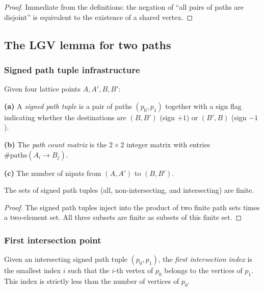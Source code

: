 \begin{proof}
\leanok
Immediate from the definitions: the negation of ``all pairs of paths are
disjoint'' is equivalent to the existence of a shared vertex.
\end{proof}

\subsection{The LGV lemma for two paths}

\subsubsection{Signed path tuple infrastructure}

\begin{definition}
\label{def.lgv.signed-pathtup2}
\leanhelper
\leanok
Given four lattice points $A, A', B, B'$:

\textbf{(a)} A \emph{signed path tuple} is a pair of paths $(p_0, p_1)$ together
with a sign flag indicating whether the destinations
are $(B, B')$ (sign $+1$) or $(B', B)$ (sign $-1$).

\textbf{(b)} The \emph{path count matrix} is
the $2 \times 2$ integer matrix with entries $\#\mathrm{paths}(A_i \to B_j)$.

\textbf{(c)} The number of nipats from
$(A, A')$ to $(B, B')$.
\end{definition}

\begin{lemma}
\label{lem.lgv.signed-pathtup2-finite}
\leanhelper
\leanok
The sets of signed path tuples (all, non-intersecting, and intersecting) are finite.
\end{lemma}

\begin{proof}
\leanok
The signed path tuples inject into the product of two finite path sets times
a two-element set. All three subsets are finite as subsets of this finite set.
\end{proof}

\subsubsection{First intersection point}

\begin{lemma}
\label{lem.lgv.first-intersection-idx}
\leanhelper
\leanok
Given an intersecting signed path tuple $(p_0, p_1)$, the \emph{first intersection
index} is the smallest index $i$ such that the $i$-th vertex of $p_0$ belongs
to the vertices of $p_1$. This index is strictly less than the number of
vertices of $p_0$.
\end{lemma}


